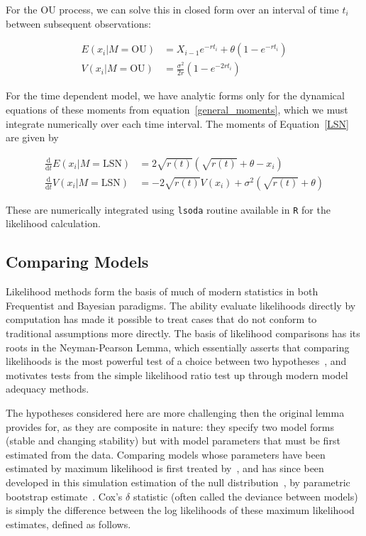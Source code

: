 \documentclass[authoryear,review,11pt]{elsarticle}
\newcommand{\ud}{\mathrm{d}}
\begin{document}
For the OU process, we can solve this in closed form over an interval of time $t_i$ between subsequent observations: 

\begin{align}
  E(x_i| M = \text{OU}) &= X_{i-1} e^{-r t_i} + \theta \left(1 - e^{-rt_i} \right) \\
V(x_i| M = \text{OU}) &= \frac{\sigma^2}{2 r} \left(1 - e^{-2 r t_i} \right)
\label{OUsoln}
\end{align}

For the time dependent model, we have analytic forms only for the dynamical equations of these moments from equation~\eqref{general_moments}, which we must integrate numerically over each time interval.
The moments of Equation~\eqref{LSN} are given by

\begin{align}
\frac{\ud }{\ud t} E(x_i| M = \text{LSN})&=  2\sqrt{r(t)}(\sqrt{r(t)}+\theta - x_i) \\
\frac{\ud}{\ud t} V(x_i| M = \text{LSN}) &=  -2 \sqrt{r(t)} V(x_i) + \sigma^2 ( \sqrt{r(t)}+\theta )
\label{LSNsoln}
\end{align}

These are numerically integrated using \texttt{lsoda} routine available in \texttt{R} for the likelihood calculation.  

\subsection*{Comparing Models}
Likelihood methods form the basis of much of modern statistics
in both Frequentist and Bayesian paradigms.  
The ability evaluate likelihoods directly by computation has made it
possible to treat cases that do not conform to traditional assumptions more directly.
The basis of likelihood comparisons has its roots in the Neyman-Pearson Lemma, 
which essentially asserts that comparing likelihoods is the most powerful test
of a choice between two hypotheses~\citep{Neyman1933}, and motivates
tests from the simple likelihood ratio test up through modern model adequacy methods.

The hypotheses considered here are more challenging then the original lemma provides for, 
as they are composite in nature:
they specify two model forms (stable and changing stability)
but with model parameters that must be first estimated from the data.
Comparing models whose parameters have been estimated by maximum likelihood is first treated by~\citet{Cox1961, Cox1962},
and has since been developed in this simulation estimation of the null distribution~\citep{McLachlan1987}, by parametric bootstrap estimate~\citep{Efron1987}.  
Cox's $\delta$ statistic (often called the deviance between models) 
is simply the difference between the log likelihoods of these maximum likelihood estimates, defined as follows.
\end{document}
